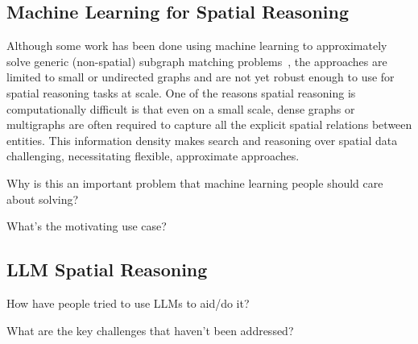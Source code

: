 \subsection{Machine Learning for Spatial Reasoning}
Although some work has been done using machine learning to approximately solve generic (non-spatial) subgraph matching problems~\cite{Krlevza2016, Liu2020Neural,Lan2021,Roy2022}, the approaches are limited to small or undirected graphs and are not yet robust enough to use for spatial reasoning tasks at scale.
One of the reasons spatial reasoning is computationally difficult is that even on a small scale, dense graphs or multigraphs are often required to capture all the explicit spatial relations between entities. 
This information density makes search and reasoning over spatial data challenging, necessitating flexible, approximate approaches.

Why is this an important problem that machine learning people should care about solving?

What's the motivating use case?




\subsection{LLM Spatial Reasoning}
How have people tried to use LLMs to aid/do it?

What are the key challenges that haven't been addressed?
